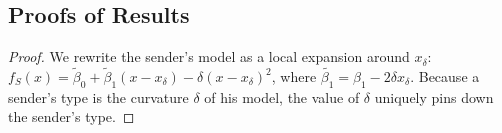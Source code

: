 \documentclass[11pt,dvipsnames]{article}
\begin{document}


\pagebreak

\begin{appendix}

\section{Proofs of Results}\label{appendix:proofs}
 
\reduction*
\begin{proof}
We rewrite the sender's model as a local expansion around $x_\delta$: $f_S(x) = \tilde{\beta}_0+\tilde{\beta}_1 (x-x_\delta)-\delta(x-x_\delta)^2$, where $\tilde{\beta_1} = \beta_1-2\delta x_\delta$.
Because a sender's type is the curvature $\delta$ of his model, the value of $\delta$ uniquely pins down the sender's type.


\end{proof}
\end{appendix}
\end{document}
